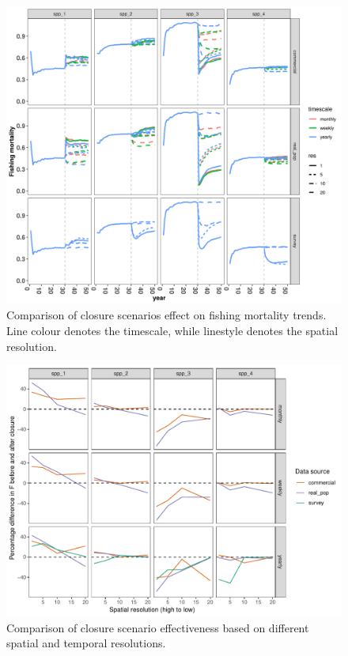 \documentclass[review]{elsarticle}
\begin{document}
\begin{figure}[!ht]
	\includegraphics[width = \linewidth]{../analysis/F_trendsREV}
	\caption{Comparison of closure scenarios effect on fishing mortality
		trends. Line colour denotes the timescale, while linestyle
		denotes the spatial resolution.}
	\label{fig:3}
\end{figure}

\begin{figure}[!ht]
	\includegraphics[width =\linewidth]{../analysis/f_diff_effectiveness}
	\caption{Comparison of closure scenario effectiveness based on
		different spatial and temporal resolutions.}
	\label{fig:4}
\end{figure}	
\end{document}
